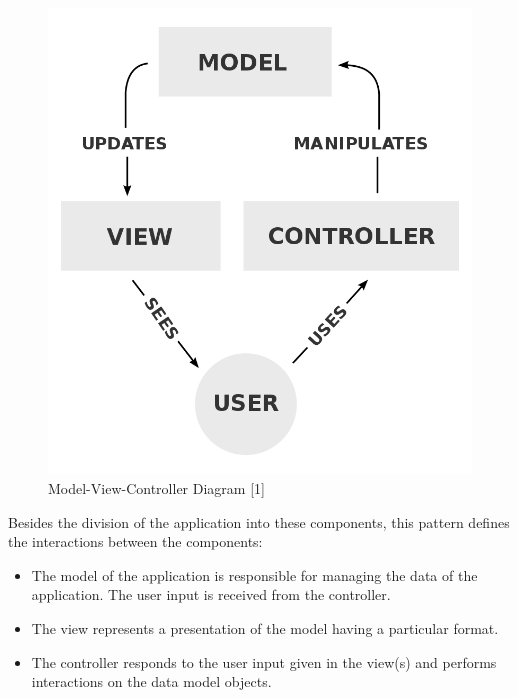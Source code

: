 \documentclass[12pt,a4paper,twoside]{report}
\begin{document}
\begin{figure}
	\centering
	\includegraphics[scale=0.2]{img/diags/MVCDiag.png}
	\caption{Model-View-Controller Diagram [1]}
\end{figure}

Besides the division of the application into these components, this pattern defines the interactions between the components:

\begin{itemize}
	\item The model of the application is responsible for managing the data of the application. The user input is received from the controller.
	\item The view represents a presentation of the model having a particular format.
	\item The controller responds to the user input given in the view(s) and performs interactions on the data model objects.
\end{itemize}
\end{document}
